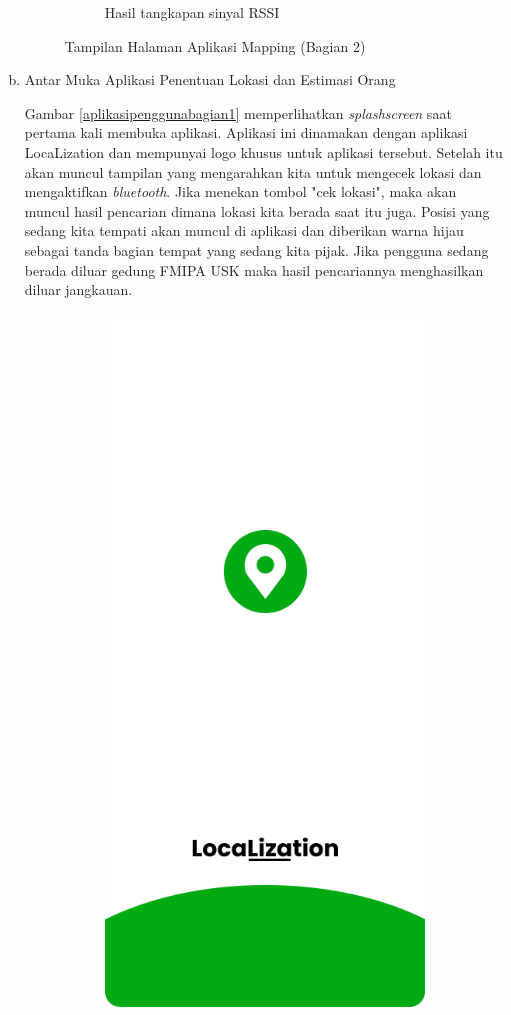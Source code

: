 \begin{enumerate}[a.]
\begin{figure} [H]
\begin{subfigure}{.5\textwidth}
			      \caption{Hasil tangkapan sinyal RSSI}
		      \end{subfigure}
		      \caption{Tampilan Halaman Aplikasi Mapping (Bagian 2)}
		      \label{aplikasimappingbagian2}
	      \end{figure}

	\item Antar Muka Aplikasi Penentuan Lokasi dan Estimasi Orang

	      \par Gambar \ref{aplikasipenggunabagian1} memperlihatkan \textit{splashscreen} saat pertama kali membuka aplikasi. Aplikasi ini dinamakan dengan aplikasi LocaLization dan mempunyai logo khusus untuk aplikasi tersebut. Setelah itu akan muncul tampilan yang mengarahkan kita untuk mengecek lokasi dan mengaktifkan \textit{bluetooth}. Jika menekan tombol "cek lokasi", maka akan muncul hasil pencarian dimana lokasi kita berada saat itu juga. Posisi yang sedang kita tempati akan muncul di aplikasi dan diberikan warna hijau sebagai tanda bagian tempat yang sedang kita pijak. Jika pengguna sedang berada diluar gedung FMIPA USK maka hasil pencariannya menghasilkan diluar jangkauan.
	      \vspace{-0cm}
	      \begin{figure} [H]
		      \begin{subfigure}{.5\textwidth}
			      \centering
			      \includegraphics[width=.5\linewidth]{gambar/splashscreen}

\end{subfigure}
\end{figure}
\end{enumerate}

